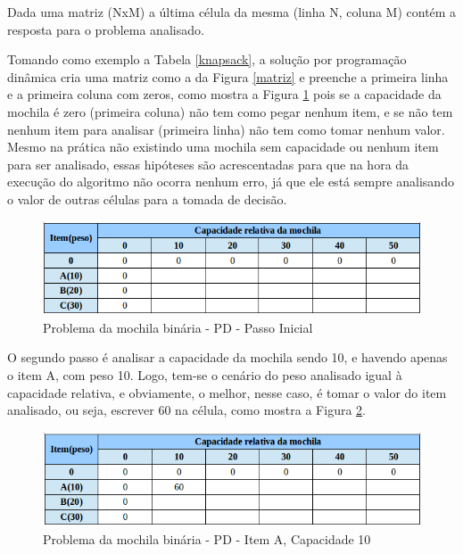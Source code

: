 Dada uma matriz (NxM) a última célula da mesma (linha N, coluna M) contém a resposta para o problema analisado. 

Tomando como exemplo a Tabela \ref{knapsack}, a solução por programação dinâmica cria uma matriz como a da Figura \ref{matriz} e preenche a primeira linha e a primeira coluna com zeros, como mostra a Figura \ref{matrizZero} pois se a capacidade da mochila é zero (primeira coluna) não tem como pegar nenhum item, e se não tem nenhum item para analisar (primeira linha) não tem como tomar nenhum valor. Mesmo na prática não existindo uma mochila sem capacidade ou nenhum item para ser analisado, essas hipóteses são acrescentadas para que na hora da execução do algoritmo não ocorra nenhum erro, já que ele está sempre analisando o valor de outras células para a tomada de decisão.

\FloatBarrier
\begin{figure}[!h]
\centering
\includegraphics[keepaspectratio=true,scale=0.5]{figuras/matrizZero.png}
\caption{Problema da mochila binária - PD - Passo Inicial}
\label{matrizZero}
\end{figure}

O segundo passo é analisar a capacidade da mochila sendo 10, e havendo apenas o item A, com peso 10. Logo, tem-se o cenário do peso analisado igual à capacidade relativa, e obviamente, o melhor, nesse caso, é tomar o valor do item analisado, ou seja, escrever 60 na célula, como mostra a Figura \ref{matriz60}.

\FloatBarrier
\begin{figure}[!h]
\centering
\includegraphics[keepaspectratio=true,scale=0.5]{figuras/matriz60.png}
\caption{Problema da mochila binária - PD - Item A, Capacidade 10}
\label{matriz60}
\end{figure}

